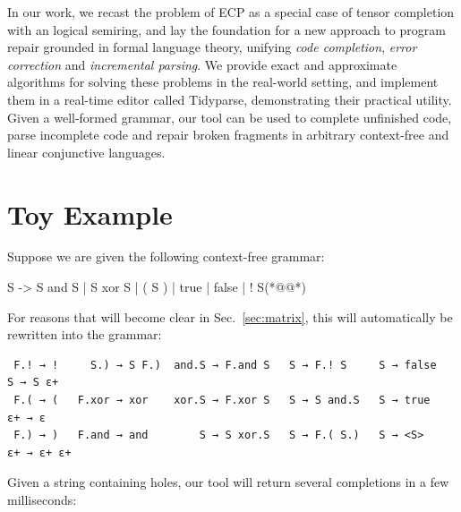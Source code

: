 \documentclass[sigplan,review,anonymous,acmsmall]{acmart}\settopmatter{printfolios=false,printccs=false,printacmref=false}
\begin{document}
In our work, we recast the problem of ECP as a special case of tensor completion with an logical semiring, and lay the foundation for a new approach to program repair grounded in formal language theory, unifying \textit{code completion}, \textit{error correction} and \textit{incremental parsing}. We provide exact and approximate algorithms for solving these problems in the real-world setting, and implement them in a real-time editor called Tidyparse, demonstrating their practical utility. Given a well-formed grammar, our tool can be used to complete unfinished code, parse incomplete code and repair broken fragments in arbitrary context-free and linear conjunctive languages.

\section{Toy Example}

Suppose we are given the following context-free grammar:

\begin{wholetidyinput}
S -> S and S | S xor S | ( S ) | true | false | ! S(*@\caret{ }@*)
\end{wholetidyinput}

\noindent For reasons that will become clear in Sec.~\ref{sec:matrix}, this will automatically be rewritten into the grammar:

\begin{verbatim}
 F.! → !     S.) → S F.)  and.S → F.and S   S → F.! S     S → false    S → S ε+
 F.( → (   F.xor → xor    xor.S → F.xor S   S → S and.S   S → true    ε+ → ε
 F.) → )   F.and → and        S → S xor.S   S → F.( S.)   S → <S>     ε+ → ε+ ε+
\end{verbatim}

%

\noindent Given a string containing holes, our tool will return several completions in a few milliseconds:
\end{document}
